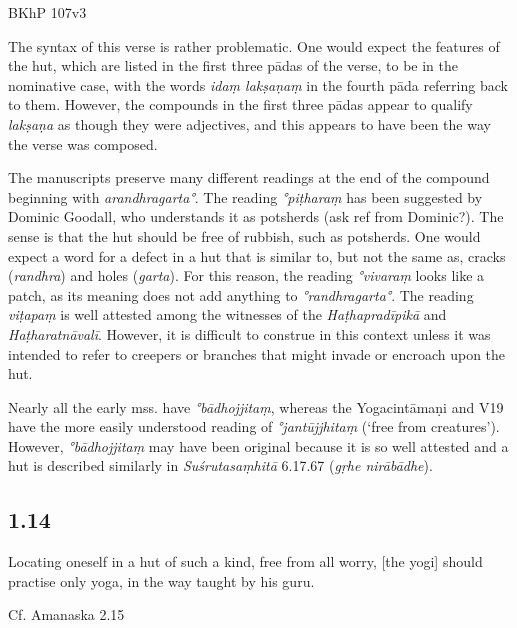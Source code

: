 \begin{ekdosis}
\begin{testimonia}[hp01_013]
BKhP 107v3
\end{testimonia}

\begin{philcomm}[hp01_013]  
The syntax of this verse is rather problematic. One would expect the features of the hut, which are listed in the first three pādas of the verse, to be in the nominative case, with the words \emph{idaṃ lakṣaṇaṃ} in the fourth pāda referring back to them. However, the compounds in the first three pādas appear to qualify \emph{lakṣaṇa} as though they were adjectives, and this appears to have been the way the verse was composed.     

The manuscripts preserve many different readings at the end of the compound beginning with \emph{arandhragarta°}. The reading \emph{°piṭharaṃ} has been suggested by Dominic Goodall, who understands it as potsherds (ask ref from Dominic?). The sense is that the hut should be free of rubbish, such as potsherds. One would expect a word for a defect in a hut that is similar to, but not the same as, cracks (\emph{randhra}) and holes (\emph{garta}). For this reason, the reading \emph{°vivaraṃ} looks like a patch, as its meaning does not add anything to \emph{°randhragarta°}. The reading \emph{viṭapaṃ} is well attested among the witnesses of the \emph{Haṭhapradīpikā} and \emph{Haṭharatnāvalī}. However, it is difficult to construe in this context unless it was intended to refer to creepers or branches that might invade or encroach upon the hut.

Nearly all the early mss. have \emph{°bādhojjitaṃ}, whereas the Yogacintāmaṇi and V19 have the more easily understood reading of \emph{°jantūjjhitaṃ} (‘free from creatures’). However, \emph{°bādhojjitaṃ} may have been original because it is so well attested and a hut is described similarly in \emph{Suśrutasaṃhitā} 6.17.67 (\emph{gṛhe nirābādhe}).
\end{philcomm}

\subsection*{1.14}
\begin{translation}[hp01_014]
Locating oneself in a hut of such a kind, free from all worry, [the yogi] should practise only yoga, in the way taught by his guru.
\end{translation}

\begin{sources}[hp01_014]
Cf. Amanaska 2.15

\begin{versinnote}
\end{versinnote}


\end{sources}
\end{ekdosis}

